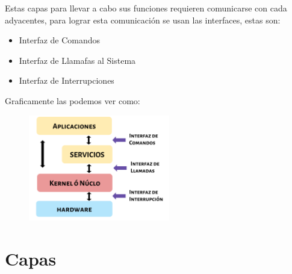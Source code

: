 \documentclass[12pt, fleqn]{report}                             %
\begin{document}
            Estas capas para llevar a cabo sus funciones requieren comunicarse con cada adyacentes,
            para lograr esta comunicación se usan las interfaces,
            estas son:
            \begin{itemize}
                \item Interfaz de Comandos
                \item Interfaz de Llamafas al Sistema
                \item Interfaz de Interrupciones        
            \end{itemize}  


            Graficamente las podemos ver como:

            \begin{figure}[h!]
                \centering
                \includegraphics[width=0.55\textwidth]{Capas}
            \end{figure}

        \clearpage
        \section{Capas}    
\end{document}
